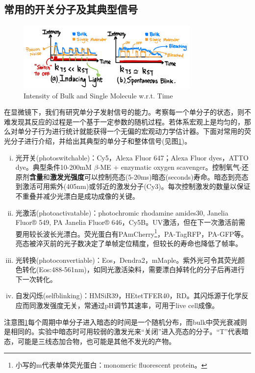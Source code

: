 \documentclass[12pt]{ctexart}
\begin{document}
\subsection*{常用的开关分子及其典型信号}
\begin{figure}[b] %
    \centering
    \includegraphics[width=0.8\textwidth]{Dynamic_diagram.jpeg}
    \caption{Intensity of Bulk and Single Molecule w.r.t. Time}
    \label{Dynamic}
\end{figure}
在显微镜下，我们有研究单分子发射信号的能力。考察每一个单分子的状态，则不难发现其反应的过程是一个基于一定参数的随机过程。若体系宏观上是均匀的，那么对单分子行为进行统计就能获得一个无偏的宏观动力学估计器。下面对常用的荧光分子进行介绍，并给出其典型的单分子和整体信号(见图\ref{Dynamic})。
\begin{enumerate}[i)]
    \item 光开关(photoswitchable)：Cy5，Alexa Fluor 647；Alexa Fluor dyes，ATTO dye。典型条件10-200mM $\beta$-ME + enzymatic oxygen scavenger。控制氧气-还原剂\textbf{含量}和\textbf{激发光强度}可以控制亮态(5-20ms)暗态(seconds)寿命。暗态到亮态到激活可用紫外(405nm)或邻近的激发分子(Cy3)。每次控制激发的数量以保证不重叠并减少光漂白是成功成像的关键。
    \item 光激活(photoactivatable)：photochromic rhodamine amides30, Janelia Fluor® 549, PA Janelia Fluor® 646，Cy5B。UV激活，但在下一次激活前需要用较长波长光漂白。荧光蛋白有PAmCherry\footnote{小写的m代表单体荧光蛋白：monomeric fluorescent protein。}，PA-TagRFP，PA-GFP等。亮态被淬灭前的光子数决定了单帧定位精度，但较长的寿命也降低了帧率。
    \item 光转换(photoconvertiable)：Eos，Dendra2，mMaple。紫外光可令其荧光颜色转化(Eos:488-561nm)，如同光激活染料，需要漂白掉转化的分子后再进行下一次转化。
    \item 自发闪烁(selfblinking)：HMSiR39，HEtetTFER40，RD。其闪烁源于化学反应而同激发强度无关，常通过pH调节其速率，可用于live cell成像。
\end{enumerate}
注意图\ref{Dynamic}每个周期中单分子进入暗态的时间是一个随机分布，而bulk中荧光衰减则是相同的。实验中暗态时可用较弱的激发光来“关闭”进入亮态的分子。“T”代表暗态，可能是三线态加合物，也可能是其他不发光的产物。
\end{document}
